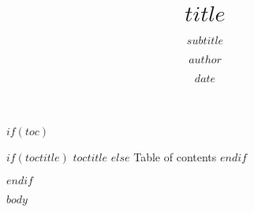 \documentclass[aspectratio=169, compress, 10pt]{beamer}
\title{$title$}
\subtitle{$subtitle$}
\author{$author$}
\institute{$institute$}
\date{$date$}
\begin{document}


$if(toc)$
\begin{frame}{
	$if(toctitle)$%
	$toctitle$%
	$else$%
	Table of contents%
	$endif$%
	}
	\tableofcontents
\end{frame}
$endif$

$body$
\end{document}
